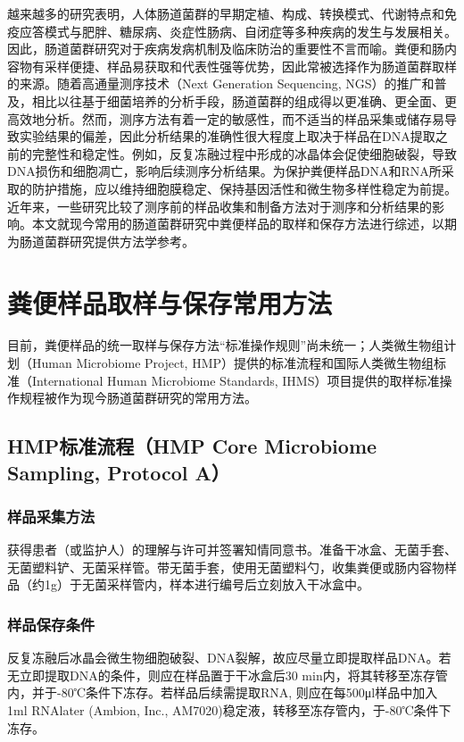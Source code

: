 越来越多的研究表明，人体肠道菌群的早期定植、构成、转换模式、代谢特点和免疫应答模式与肥胖、糖尿病、炎症性肠病、自闭症等多种疾病的发生与发展相关\cite{Li2016c,lozupone2012diversity}。因此，肠道菌群研究对于疾病发病机制及临床防治的重要性不言而喻。粪便和肠内容物有采样便捷、样品易获取和代表性强等优势，因此常被选择作为肠道菌群取样的来源\cite{Saxena2016,Raoult2014,Gill2006}。随着高通量测序技术（Next Generation Sequencing, NGS）的推广和普及，相比以往基于细菌培养的分析手段，肠道菌群的组成得以更准确、更全面、更高效地分析\cite{Goodwin2016,Fraher2012a}。然而，测序方法有着一定的敏感性，而不适当的样品采集或储存易导致实验结果的偏差，因此分析结果的准确性很大程度上取决于样品在DNA提取之前的完整性和稳定性。例如，反复冻融过程中形成的冰晶体会促使细胞破裂，导致DNA损伤和细胞凋亡，影响后续测序分析结果\cite{Fraser2011}。为保护粪便样品DNA和RNA所采取的防护措施，应以维持细胞膜稳定、保持基因活性和微生物多样性稳定为前提。近年来，一些研究比较了测序前的样品收集和制备方法对于测序和分析结果的影响。本文就现今常用的肠道菌群研究中粪便样品的取样和保存方法进行综述，以期为肠道菌群研究提供方法学参考。

\section{粪便样品取样与保存常用方法}

目前，粪便样品的统一取样与保存方法“标准操作规则”尚未统一；人类微生物组计划（Human Microbiome Project, HMP）提供的标准流程和国际人类微生物组标准（International Human Microbiome Standards, IHMS）项目提供的取样标准操作规程被作为现今肠道菌群研究的常用方法\cite{li2016characterization,Mai2011a,Chu2017,Schmidt2017}。

\subsection{HMP标准流程（HMP Core Microbiome Sampling, Protocol A）}
\subsubsection{样品采集方法}
获得患者（或监护人）的理解与许可并签署知情同意书。准备干冰盒、无菌手套、无菌塑料铲、无菌采样管。带无菌手套，使用无菌塑料勺，收集粪便或肠内容物样品（约1g）于无菌采样管内，样本进行编号后立刻放入干冰盒中\cite{wu2018optimization}。
\subsubsection{样品保存条件}
反复冻融后冰晶会微生物细胞破裂、DNA裂解，故应尽量立即提取样品DNA。若无立即提取DNA的条件，则应在样品置于干冰盒后30 min内，将其转移至冻存管内，并于-80℃条件下冻存。若样品后续需提取RNA, 则应在每500μl样品中加入1ml RNAlater\textsuperscript{\textregistered} (Ambion, Inc., AM7020)稳定液，转移至冻存管内，于-80℃条件下冻存\cite{wu2018optimization}。

